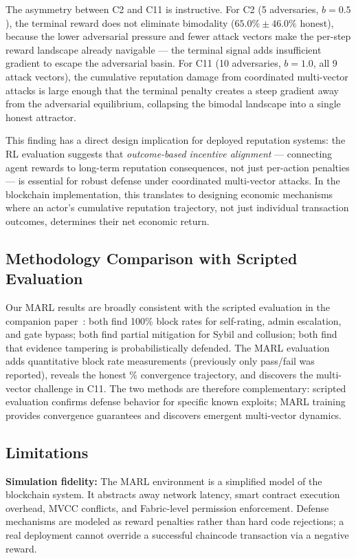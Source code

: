 The asymmetry between C2 and C11 is instructive.  For C2 (5 adversaries,
$b = 0.5$), the terminal reward does not eliminate bimodality
($65.0\% \pm 46.0\%$ honest), because the lower adversarial pressure and
fewer attack vectors make the per-step reward landscape already navigable ---
the terminal signal adds insufficient gradient to escape the adversarial basin.
For C11 (10 adversaries, $b = 1.0$, all 9 attack vectors), the cumulative
reputation damage from coordinated multi-vector attacks is large enough that
the terminal penalty creates a steep gradient away from the adversarial
equilibrium, collapsing the bimodal landscape into a single honest attractor.

This finding has a direct design implication for deployed reputation systems:
the RL evaluation suggests that \emph{outcome-based incentive alignment} ---
connecting agent rewards to long-term reputation consequences, not just
per-action penalties --- is essential for robust defense under coordinated
multi-vector attacks.  In the blockchain implementation, this translates to
designing economic mechanisms where an actor's cumulative reputation
trajectory, not just individual transaction outcomes, determines their
net economic return.

\subsection{Methodology Comparison with Scripted Evaluation}

Our MARL results are broadly consistent with the scripted evaluation in the
companion paper~\cite{almaayn2024unified}: both find 100\% block rates for
self-rating, admin escalation, and gate bypass; both find partial mitigation
for Sybil and collusion; both find that evidence tampering is probabilistically
defended.  The MARL evaluation adds quantitative block rate measurements
(previously only pass/fail was reported), reveals the honest \% convergence
trajectory, and discovers the multi-vector challenge in C11.  The two methods
are therefore complementary: scripted evaluation confirms defense behavior for
specific known exploits; MARL training provides convergence guarantees and
discovers emergent multi-vector dynamics.

\subsection{Limitations}

\textbf{Simulation fidelity:} The MARL environment is a simplified model of
the blockchain system.  It abstracts away network latency, smart contract
execution overhead, MVCC conflicts, and Fabric-level permission enforcement.
Defense mechanisms are modeled as reward penalties rather than hard code
rejections; a real deployment cannot override a successful chaincode
transaction via a negative reward.

